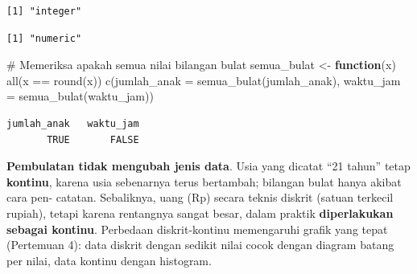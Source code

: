 \documentclass[
  indonesian,
  letterpaper,
]{book}
\newenvironment{Shaded}{\begin{snugshade}}{\end{snugshade}}
\newcommand{\AttributeTok}[1]{\textcolor[rgb]{0.40,0.45,0.13}{#1}}
\newcommand{\CommentTok}[1]{\textcolor[rgb]{0.37,0.37,0.37}{#1}}
\newcommand{\ControlFlowTok}[1]{\textcolor[rgb]{0.00,0.23,0.31}{\textbf{#1}}}
\newcommand{\FunctionTok}[1]{\textcolor[rgb]{0.28,0.35,0.67}{#1}}
\newcommand{\NormalTok}[1]{\textcolor[rgb]{0.00,0.23,0.31}{#1}}
\newcommand{\OtherTok}[1]{\textcolor[rgb]{0.00,0.23,0.31}{#1}}
\newcommand{\SpecialCharTok}[1]{\textcolor[rgb]{0.37,0.37,0.37}{#1}}
\begin{document}
\begin{verbatim}
[1] "integer"
\end{verbatim}

\begin{verbatim}
[1] "numeric"
\end{verbatim}

\begin{Shaded}
\begin{Highlighting}[]
\CommentTok{\# Memeriksa apakah semua nilai bilangan bulat}
\NormalTok{semua\_bulat }\OtherTok{\textless{}{-}} \ControlFlowTok{function}\NormalTok{(x) }\FunctionTok{all}\NormalTok{(x }\SpecialCharTok{==} \FunctionTok{round}\NormalTok{(x))}
\FunctionTok{c}\NormalTok{(}\AttributeTok{jumlah\_anak =} \FunctionTok{semua\_bulat}\NormalTok{(jumlah\_anak), }\AttributeTok{waktu\_jam =} \FunctionTok{semua\_bulat}\NormalTok{(waktu\_jam))}
\end{Highlighting}
\end{Shaded}

\begin{verbatim}
jumlah_anak   waktu_jam 
       TRUE       FALSE 
\end{verbatim}

\textbf{Pembulatan tidak mengubah jenis data}. Usia yang dicatat ``21
tahun'' tetap \textbf{kontinu}, karena usia sebenarnya terus bertambah;
bilangan bulat hanya akibat cara pen- catatan. Sebaliknya, uang (Rp)
secara teknis diskrit (satuan terkecil rupiah), tetapi karena rentangnya
sangat besar, dalam praktik \textbf{diperlakukan sebagai kontinu}.
Perbedaan diskrit-kontinu memengaruhi grafik yang tepat (Pertemuan 4):
data diskrit dengan sedikit nilai cocok dengan diagram batang per nilai,
data kontinu dengan histogram.
\end{document}

